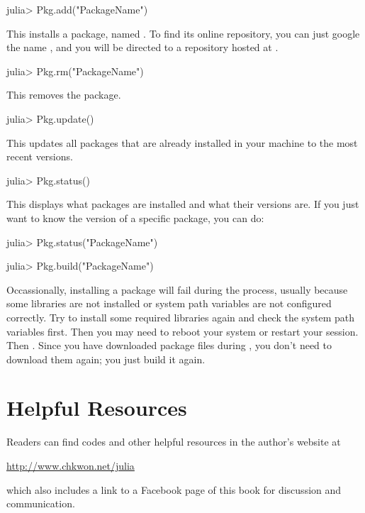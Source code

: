 \begin{code}
julia> Pkg.add("PackageName")
\end{code}
\noindent This installs a package, named . To find its online repository, you can just google the name , and you will be directed to a repository hosted at .

\begin{code}
julia> Pkg.rm("PackageName")
\end{code}
\noindent This removes the package.

\begin{code}
julia> Pkg.update()
\end{code}
\noindent This updates all packages that are already installed in your machine to the most recent versions.

\begin{code}
julia> Pkg.status()
\end{code}
\noindent This displays what packages are installed and what their versions are. If you just want to know the version of a specific package, you can do:
\begin{code}
julia> Pkg.status("PackageName")
\end{code}

\begin{code}
julia> Pkg.build("PackageName")
\end{code}
\noindent Occassionally, installing a package will fail during the  process, usually because some libraries are not installed or system path variables are not configured correctly. Try to install some required libraries again and check the system path variables first. Then you may need to reboot your system or restart your \julia{} session. Then . Since you have downloaded package files during , you don't need to download them again; you just build it again.





\section{Helpful Resources}

Readers can find codes and other helpful resources in the author's website at
\begin{center}
\url{http://www.chkwon.net/julia}
\end{center}
which also includes a link to a Facebook page of this book for discussion and communication.

